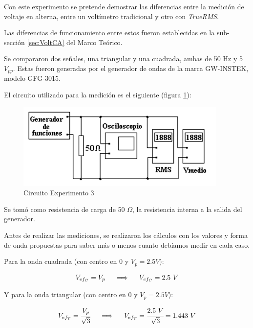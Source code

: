 
Con este experimento se pretende demostrar las diferencias  entre la medición de voltaje en alterna, entre un voltímetro tradicional y otro con \textit{TrueRMS}. 

Las diferencias de funcionamiento entre estos fueron establecidas en la sub-sección \ref{sec:VoltCA} del Marco Teórico. 

Se compararon dos señales, una triangular y una cuadrada, ambas de 50 Hz y 5 $V_{pp}$. Estas fueron generadas por el generador de ondas de la marca GW-INSTEK, modelo GFG-3015.

El circuito utilizado para la medición es el siguiente (figura \ref{fig:exp3med}):

\begin{figure}[H]
    \centering
    \includegraphics[width=0.6\linewidth]{Imagenes/exp3med.png}
    \caption{Circuito Experimento 3}
    \label{fig:exp3med}
\end{figure}

Se tomó como resistencia de carga de 50 $\Omega$, la resistencia interna a la salida del generador.



Antes de realizar las mediciones, se realizaron los cálculos con los valores y forma de onda propuestas para saber más o menos cuanto debíamos medir en cada caso.

Para la onda cuadrada (con centro en 0 y $V_p = 2.5 V$): 

\begin{equation}
    V_{ef_C} = V_p
    \hspace{5mm}\Longrightarrow\hspace{5mm}
    V_{ef_C} = 2.5~V
\end{equation}

Y para la onda triangular (con centro en 0 y $V_p = 2.5 V$): 

\begin{equation}
    V_{ef_T} = \cfrac{V_p}{\sqrt{3}}
    \hspace{5mm}\Longrightarrow\hspace{5mm}
    V_{ef_T} = \cfrac{2.5~V}{\sqrt{3}} = 1.443~V
\end{equation}

